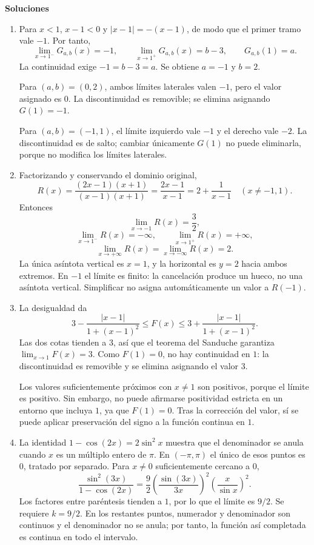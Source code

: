 \documentclass[10pt,a5paper]{article}
\newif\ifmostrarSoluciones
\begin{document}
\ifmostrarSoluciones
\newpage
\begin{center}
  {\color{Azul}\large\bfseries Soluciones}
\end{center}
\begin{enumerate}
  \item Para $x<1$, $x-1<0$ y $|x-1|=-(x-1)$, de modo que el primer tramo vale $-1$. Por tanto,
  \[
    \lim_{x\to1^-}G_{a,b}(x)=-1,\qquad
    \lim_{x\to1^+}G_{a,b}(x)=b-3,\qquad G_{a,b}(1)=a.
  \]
  La continuidad exige $-1=b-3=a$. Se obtiene $a=-1$ y $b=2$.

  Para $(a,b)=(0,2)$, ambos límites laterales valen $-1$, pero el valor asignado es $0$. La discontinuidad es removible; se elimina asignando $G(1)=-1$.

  Para $(a,b)=(-1,1)$, el límite izquierdo vale $-1$ y el derecho vale $-2$. La discontinuidad es de salto; cambiar únicamente $G(1)$ no puede eliminarla, porque no modifica los límites laterales.
  \item Factorizando y conservando el dominio original,
  \[
    R(x)=\frac{(2x-1)(x+1)}{(x-1)(x+1)}
    =\frac{2x-1}{x-1}=2+\frac1{x-1}
    \quad(x\neq-1,1).
  \]
  Entonces
  \[
    \lim_{x\to-1}R(x)=\frac32,
  \]
  \[
    \lim_{x\to1^-}R(x)=-\infty,\qquad
    \lim_{x\to1^+}R(x)=+\infty,
  \]
  \[
    \lim_{x\to+\infty}R(x)=\lim_{x\to-\infty}R(x)=2.
  \]
  La única asíntota vertical es $x=1$, y la horizontal es $y=2$ hacia ambos extremos. En $-1$ el límite es finito: la cancelación produce un hueco, no una asíntota vertical. Simplificar no asigna automáticamente un valor a $R(-1)$.

  \item La desigualdad da
  \[
    3-\frac{|x-1|}{1+(x-1)^2}
    \leq F(x)\leq
    3+\frac{|x-1|}{1+(x-1)^2}.
  \]
  Las dos cotas tienden a $3$, así que el teorema del Sanduche garantiza $\lim_{x\to1}F(x)=3$. Como $F(1)=0$, no hay continuidad en $1$: la discontinuidad es removible y se elimina asignando el valor $3$.

  Los valores suficientemente próximos con $x\neq1$ son positivos, porque el límite es positivo. Sin embargo, no puede afirmarse positividad estricta en un entorno que incluya $1$, ya que $F(1)=0$. Tras la corrección del valor, sí se puede aplicar preservación del signo a la función continua en $1$.

  \item La identidad $1-\cos(2x)=2\sin^2x$ muestra que el denominador se anula cuando $x$ es un múltiplo entero de $\pi$. En $(-\pi,\pi)$ el único de esos puntos es $0$, tratado por separado. Para $x\neq0$ suficientemente cercano a $0$,
  \[
    \frac{\sin^2(3x)}{1-\cos(2x)}
    =\frac92\left(\frac{\sin(3x)}{3x}\right)^2
      \left(\frac{x}{\sin x}\right)^2.
  \]
  Los factores entre paréntesis tienden a $1$, por lo que el límite es $9/2$. Se requiere $k=9/2$. En los restantes puntos, numerador y denominador son continuos y el denominador no se anula; por tanto, la función así completada es continua en todo el intervalo.


\end{enumerate}
\end{document}
